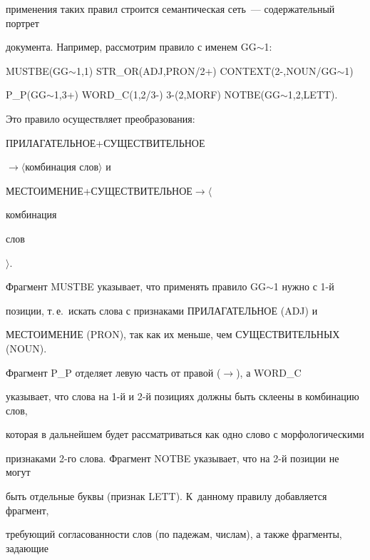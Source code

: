 применения таких правил строится семантическая сеть~--- содержательный портрет 


документа. Например, рассмотрим правило с именем GG$\sim$1:





{\sf    MUSTBE(GG$\sim$1,1) STR\_OR(ADJ,PRON/2+) CONTEXT(2-,NOUN/GG$\sim$1)





    P\_P(GG$\sim$1,3+) WORD\_C(1,2/3-) 3-(2,MORF) NOTBE(GG$\sim$1,2,LETT).}





Это правило осуществляет преобразования: 





{\sf ПРИЛАГАТЕЛЬНОЕ\;+\;СУЩЕСТВИТЕЛЬНОЕ\;}


$\rightarrow$\;$\langle${\sf комбинация слов}$\rangle$ и





{\sf МЕСТОИМЕНИЕ\;+\;СУЩЕСТВИТЕЛЬНОЕ}\;$\rightarrow$\;$\langle${\sf комбинация 


слов}$\rangle$. 


    


    Фрагмент {\sf MUSTBE} указывает, что применять правило GG$\sim$1 нужно с \mbox{1-й} 


позиции, т.\,е.\ искать слова с признаками {\sf ПРИЛАГАТЕЛЬНОЕ (ADJ)} и 


{\sf МЕСТОИМЕНИЕ (PRON)}, так как их меньше, чем {\sf СУЩЕСТВИТЕЛЬНЫХ (NOUN)}.





Фрагмент P\_P отделяет левую часть от правой ($\rightarrow$), а {\sf WORD\_C} 


указывает, что слова на 1-й и 2-й позициях должны быть склеены в комбинацию слов, 


которая в дальнейшем будет рассматриваться как одно слово с морфологическими 


признаками 2-го слова. Фрагмент {\sf NOTBE} указывает, что на 2-й позиции не могут 


быть отдельные буквы (признак {\sf LETT}). К~данному правилу добавляется фрагмент, 


требующий согласованности слов (по падежам, числам), а также фрагменты, задающие 


